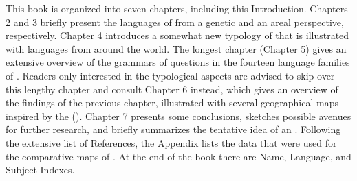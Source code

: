 This book is organized into seven chapters, including this Introduction. Chapters 2 and 3 briefly present the languages of  from a genetic and an areal perspective, respectively. Chapter 4 introduces a somewhat new typology of  that is illustrated with languages from around the world. The longest chapter (Chapter 5) gives an extensive overview of the grammars of questions in the fourteen language families of . Readers only interested in the typological aspects are advised to skip over this lengthy chapter and consult Chapter 6 instead, which gives an overview of the findings of the previous chapter, illustrated with several geographical maps inspired by the \textit{} (\citealt{DryerHaspelmath2013}). Chapter 7 presents some conclusions, sketches possible avenues for further research, and briefly summarizes the tentative idea of an \textit{}. Following the extensive list of References, the Appendix lists the data that were used for the comparative maps of . At the end of the book there are Name, Language, and Subject Indexes.